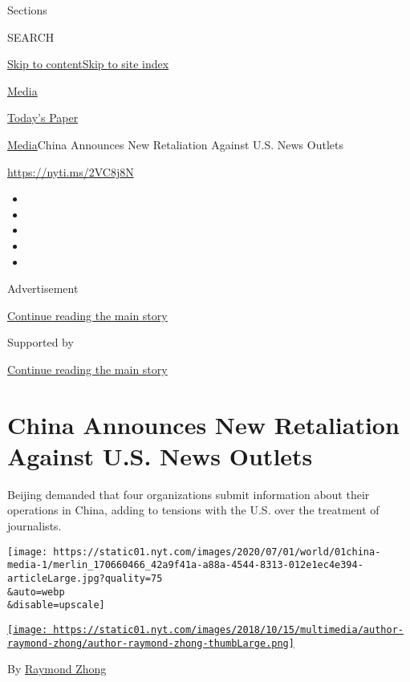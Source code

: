 Sections

SEARCH

\protect\hyperlink{site-content}{Skip to
content}\protect\hyperlink{site-index}{Skip to site index}

\href{https://www.nytimes.com/section/business/media}{Media}

\href{https://myaccount.nytimes.com/auth/login?response_type=cookie\&client_id=vi}{}

\href{https://www.nytimes.com/section/todayspaper}{Today's Paper}

\href{/section/business/media}{Media}\textbar{}China Announces New
Retaliation Against U.S. News Outlets

\url{https://nyti.ms/2VC8j8N}

\begin{itemize}
\item
\item
\item
\item
\item
\end{itemize}

Advertisement

\protect\hyperlink{after-top}{Continue reading the main story}

Supported by

\protect\hyperlink{after-sponsor}{Continue reading the main story}

\hypertarget{china-announces-new-retaliation-against-us-news-outlets}{%
\section{China Announces New Retaliation Against U.S. News
Outlets}\label{china-announces-new-retaliation-against-us-news-outlets}}

Beijing demanded that four organizations submit information about their
operations in China, adding to tensions with the U.S. over the treatment
of journalists.

\texttt{[image: https://static01.nyt.com/images/2020/07/01/world/01china-media-1/merlin\_170660466\_42a9f41a-a88a-4544-8313-012e1ec4e394-articleLarge.jpg?quality=75\\\&auto=webp\\\&disable=upscale]}

\href{https://www.nytimes.com/by/raymond-zhong}{\texttt{[image: https://static01.nyt.com/images/2018/10/15/multimedia/author-raymond-zhong/author-raymond-zhong-thumbLarge.png]}}

By \href{https://www.nytimes.com/by/raymond-zhong}{Raymond Zhong}

